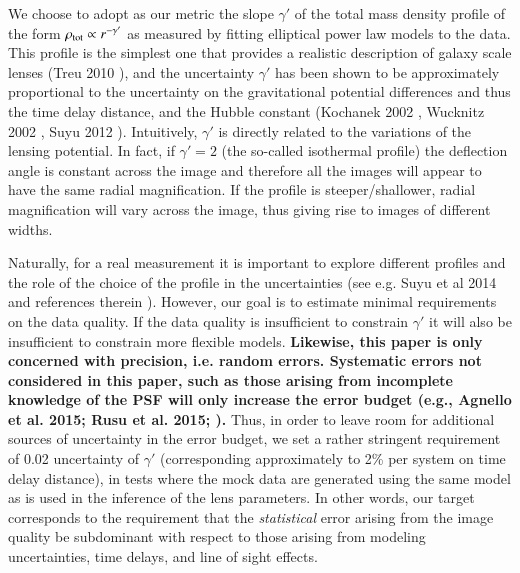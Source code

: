 \documentclass[a4paper,11pt]{article}
\begin{document}
We choose to adopt as our metric the slope $\gamma'$ of the total mass
density profile of the form $\rho_{\rm tot}\propto r^{-\gamma'}$ as
measured by fitting elliptical power law models to the data. This
profile is the simplest one that provides a realistic description of
galaxy scale lenses (Treu 2010 \citep{2010ARA&A..48...87T}), and the
uncertainty $\gamma'$ has been shown to be approximately proportional
to the uncertainty on the gravitational potential differences and thus
the time delay distance, and the Hubble constant (Kochanek 2002
\citep{2002ApJ...578...25K}, Wucknitz 2002
\citep{2002MNRAS.332..951W}, Suyu 2012
\citep{2012MNRAS.426..868S}).  Intuitively, $\gamma'$ is directly
related to the variations of the lensing potential. In fact, if
$\gamma'=2$ (the so-called isothermal profile) the deflection angle is
constant across the image and therefore all the images will appear to
have the same radial magnification. If the profile is
steeper/shallower, radial magnification will vary across the image,
thus giving rise to images of different widths.

Naturally, for a real measurement it is important to explore different
profiles and the role of the choice of the profile in the
uncertainties (see e.g. Suyu et al 2014 and references therein
\cite{2014ApJ...788L..35S}). However, our goal is to estimate minimal
requirements on the data quality. If the data quality is insufficient
to constrain $\gamma'$ it will also be insufficient to constrain more
flexible models. {\bf Likewise, this paper is only concerned with
precision, i.e. random errors. Systematic errors not considered in
this paper, such as those arising from incomplete knowledge of the PSF
will only increase the error budget (e.g., Agnello et al. 2015; Rusu
et al. 2015;
\citep{2015arXiv150602720A,2015arXiv150605147R}).}
%
Thus, in order to leave room for additional sources of uncertainty in
the error budget, we set a rather stringent requirement of 0.02
uncertainty of $\gamma'$ (corresponding approximately to 2\% per
system on time delay distance), in tests where the mock data are
generated using the same model as is used in the inference of the lens
parameters. In other words, our target corresponds to the requirement
that the {\it statistical} error arising from the image quality be
subdominant with respect to those arising from modeling uncertainties,
time delays, and line of sight effects.
\end{document}
